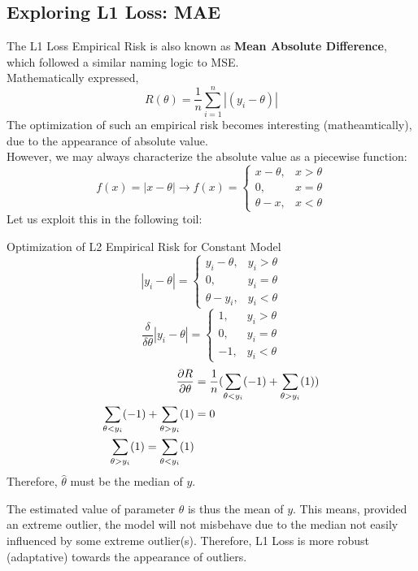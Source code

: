 \subsection{Exploring L1 Loss: MAE}
The L1 Loss Empirical Risk is also known as \textbf{Mean Absolute Difference}, which followed a similar naming logic to MSE. \\
Mathematically expressed,
\[R(\theta) = \frac{1}{n} \sum_{i = 1}^n |(y_i - \theta)|\]
The optimization of such an empirical risk becomes interesting (matheamtically), due to the appearance of absolute value. \\
However, we may always characterize the absolute value as a piecewise function:
\[
    f(x) = |x - \theta|
    \rightarrow
    f(x) = 
    \begin{cases}
        x - \theta, &x > \theta \\
        0, &x = \theta \\
        \theta - x, &x < \theta
    \end{cases}
\]
Let us exploit this in the following toil:
\begin{ln-derive}{Optimization of L2 Empirical Risk for Constant Model}{}
    \[
        |y_i - \theta|
         = 
        \begin{cases}
            y_i - \theta, &y_i > \theta \\
            0, &y_i = \theta \\
            \theta - y_i, &y_i < \theta
        \end{cases}
    \]
    \[
        \frac{\delta}{\delta \theta}|y_i - \theta|
        = 
        \begin{cases}
            1, &y_i > \theta \\
            0, &y_i = \theta \\
            -1, &y_i < \theta
        \end{cases}
    \]
    \begin{align*}
        \pdv{R}{\theta}
        &= \frac{1}{n} (\sum_{\theta < y_i}(-1) + \sum_{\theta > y_i}(1)) \\
        \sum_{\theta < y_i}(-1) + \sum_{\theta > y_i}(1) &= 0 \\
        \sum_{\theta > y_i}(1) = \sum_{\theta < y_i}(1)
    \end{align*}
    Therefore, $\hat{\theta}$ must be the median of $y$.
\end{ln-derive}
The estimated value of parameter $\theta$ is thus the mean of $y$. This means, provided an extreme outlier, the model will not misbehave due to the median not easily influenced by some extreme outlier(s). Therefore, L1 Loss is more robust (adaptative) towards the appearance of outliers. \\

